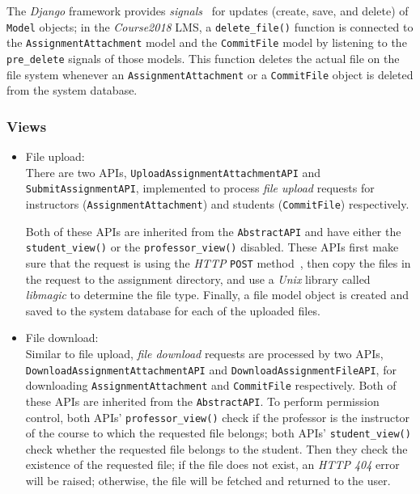 The \emph{Django} framework provides \emph{signals}~\cite{EdjangoSignal}
for updates (create, save, and delete) of \texttt{Model} objects; in the
\emph{Course2018} LMS, a \texttt{delete\_file()} function is connected to
the \texttt{AssignmentAttachment} model and the \texttt{CommitFile} model by
listening to the \texttt{pre\_delete} signals of those models. This function
deletes the actual file on the file system whenever an
\texttt{AssignmentAttachment} or a \texttt{CommitFile} object is deleted from
the system database.

\subsubsection{Views}
\begin{itemize}
    \item File upload: \\
    There are two APIs, 
    \texttt{Upload\-Assign\-ment\-Attach\-ment\-API} and
    \texttt{Sub\-mit\-Assign\-ment\-API}, 
    implemented to process \emph{file upload} requests
    for instructors (\texttt{Assign\-ment\-Attach\-ment}) and students
    (\texttt{CommitFile}) respectively.

    Both of these APIs are inherited from the 
    \texttt{AbstractAPI} and have either the \texttt{student\_view()}
    or the \texttt{professor\_view()} disabled.
    These APIs first make sure that the request is using the
    \emph{HTTP} \texttt{POST} method~\citep[Section 4.3.3]{http},
    then copy the files in the request to the assignment directory, and use 
    a \emph{Unix} library called \emph{libmagic} \cite{libmagic} to determine
    the file type.
    Finally, a file model object is created and saved to the system database
    for each of the uploaded files.

    \item File download: \\
    Similar to file upload, \emph{file download} requests are processed by
    two APIs, \texttt{Down\-load\-Assign\-ment\-Attach\-ment\-API} and
    \texttt{Down\-load\-Assign\-ment\-File\-API},
    for downloading \texttt{AssignmentAttachment} and \texttt{CommitFile}
    respectively.
    Both
    of these APIs are inherited from the \texttt{AbstractAPI}\null.
    To perform permission control,
    both APIs' \texttt{professor\_view()} check if the professor is the
    instructor of the course to which the requested file belongs; both APIs'
    \texttt{student\_view()} check whether the requested file belongs to the student.
    Then they check the existence of the requested file; if the file
    does not exist, an \emph{HTTP 404} error~\citep[Section 6.5.4]{http} will be
    raised; otherwise, the
    file will be fetched and returned to the user.


\end{itemize}
